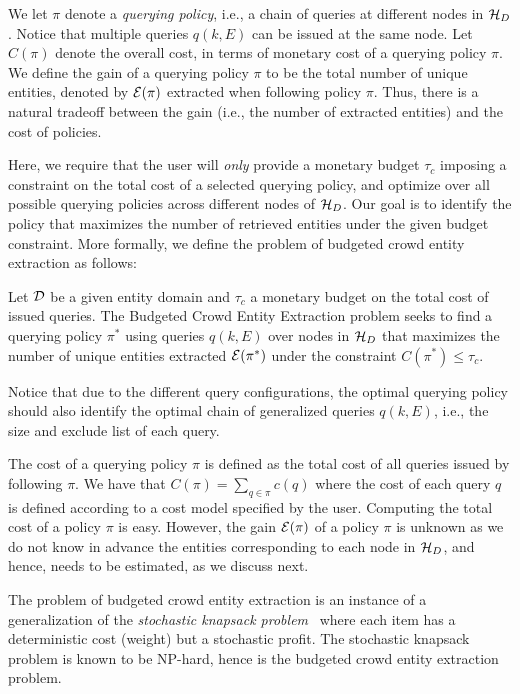 We let $\pi$ denote a {\em querying policy}, i.e., a chain of queries at different nodes in $\mathcal{H}_D$. Notice that multiple queries $q(k,E)$ can be issued at the same node. Let $C(\pi)$ denote the overall cost, in terms of monetary cost of a querying policy $\pi$. We define the gain of a querying policy $\pi$ to be the total number of unique entities, denoted by $\mathcal{E}(\pi)$ extracted when following policy $\pi$. Thus, there is a natural tradeoff between the gain (i.e., the number of extracted entities) and the cost of policies. 

Here, we require that the user will {\em only} provide a monetary budget $\tau_c$ imposing a constraint on the total cost of a selected querying policy, and optimize over all possible querying policies across different nodes of $\mathcal{H}_D$. Our goal is to identify the policy that maximizes the number of retrieved entities under the given budget constraint. More formally, we define the problem of budgeted crowd entity extraction as follows:

\begin{problem}
Let $\mathcal{D}$ be a given entity domain and $\tau_c$ a monetary budget on the total cost of issued queries. The Budgeted Crowd Entity Extraction problem seeks to find a querying policy $\pi^*$ using queries $q(k,E)$ over nodes in $\mathcal{H}_D$ that maximizes the number of unique entities extracted $\mathcal{E}(\pi^*)$ under the constraint $C(\pi^*) \leq \tau_c$.
\end{problem}
Notice that due to the different query configurations, the optimal querying policy should also identify the optimal chain of generalized queries $q(k,E)$, i.e., the size and exclude list of each query.

The cost of a querying policy $\pi$ is defined as the total cost of all queries issued by following $\pi$. We have that $C(\pi) = \sum_{q \in \pi} c(q)$ where the cost of each query $q$ is defined according to a cost model specified by the user. Computing the total cost of a policy $\pi$ is easy. However, the gain $\mathcal{E}(\pi)$ of a policy $\pi$ is unknown as we do not know in advance the entities corresponding to each node in $\mathcal{H}_D$, and hence, needs to be estimated, as we discuss next. 

The problem of budgeted crowd entity extraction is an instance of a generalization of the {\em stochastic knapsack problem}~\cite{kosuch,steinberg} where each item has a deterministic cost (weight) but a stochastic profit. The stochastic knapsack problem is known to be NP-hard, hence is the budgeted crowd entity extraction problem.

